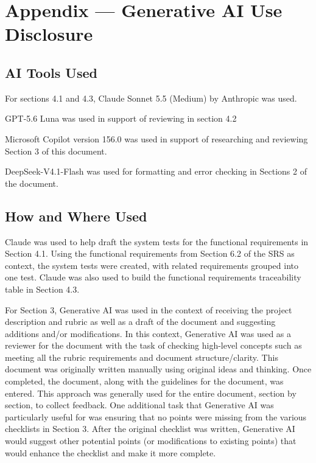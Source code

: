 \documentclass[12pt, titlepage]{article}
\begin{document}
\begin{enumerate}
    \end{enumerate}


\newpage{}

\section{Appendix --- Generative AI Use Disclosure}

\subsection{AI Tools Used}

For sections 4.1 and 4.3, Claude Sonnet 5.5 (Medium) by Anthropic was used.

GPT-5.6 Luna was used in support of reviewing in section 4.2

Microsoft Copilot version 156.0 was used in support of researching and reviewing Section 3 of this document.

DeepSeek-V4.1-Flash was used for formatting and error checking in Sections 2 of the document.

\subsection{How and Where Used}

Claude was used to help draft the system tests for the functional requirements in Section 4.1. Using the functional requirements from Section 6.2 of the SRS as context, the system tests were created, with related requirements grouped into one test. Claude was also used to build the functional requirements traceability table in Section 4.3.

For Section 3, Generative AI was used in the context of receiving the project description and rubric as well as a draft of the document and suggesting additions and/or modifications. In this context, Generative AI was used as a reviewer for the document with the task of checking high-level concepts such as meeting all the rubric requirements and document structure/clarity. This document was originally written manually using original ideas and thinking. Once completed, the document, along with the guidelines for the document, was entered. This approach was generally used for the entire document, section by section, to collect feedback. One additional task that Generative AI was particularly useful for was ensuring that no points were missing from the various checklists in Section 3. After the original checklist was written, Generative AI would suggest other potential points (or modifications to existing points) that would enhance the checklist and make it more complete.
\end{document}
